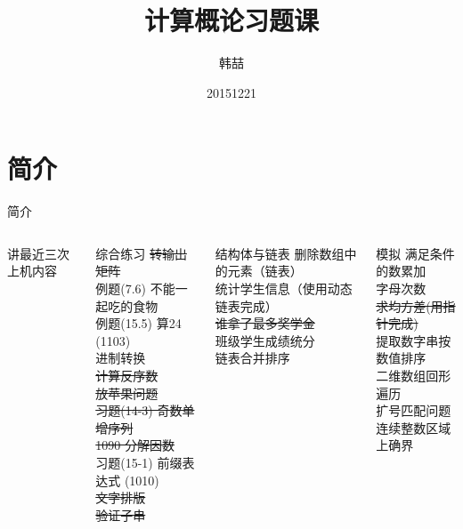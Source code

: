 \documentclass[color=usenames,dvipsnames]{beamer}
\title[COE2015上机题]{计算概论习题课}
\author{韩喆}
\institute{WIP@ICST}
\date{20151221}
\begin{document}
\begin{frame}
  \titlepage
\end{frame}


\section{简介}

\begin{frame}{简介}\footnotesize

\begin{columns}
 \column{0.45\hsize}
讲最近三次上机内容
\vspace{0.5cm}

 \begin{block}{综合练习}
\sout{转输出矩阵} \\ 
例题(7.6) 不能一起吃的食物 \\ 
例题(15.5) 算24 (1103) \\ 
进制转换 \\ 
\sout{计算反序数} \\ 
\sout{放苹果问题} \\ 
\sout{习题(14-3) 奇数单增序列} \\ 
\sout{1090 分解因数} \\ 
习题(15-1) 前缀表达式 (1010) \\ 
\sout{文字排版} \\ 
\sout{验证子串 }
 \end{block}
 

 \column{0.45\hsize}
 \begin{block}{结构体与链表}
 删除数组中的元素（链表）\\ 
统计学生信息（使用动态链表完成）\\ 
\sout{谁拿了最多奖学金}\\ 
班级学生成绩统分\\ 
链表合并排序
 \end{block}
 \begin{block}{模拟}
 满足条件的数累加\\ 
字母次数\\ 
\sout{求均方差(用指针完成)}\\ 
提取数字串按数值排序\\ 
二维数组回形遍历\\ 
扩号匹配问题\\ 
连续整数区域上确界
 \end{block} 
\end{columns}

\end{frame}
\end{document}
